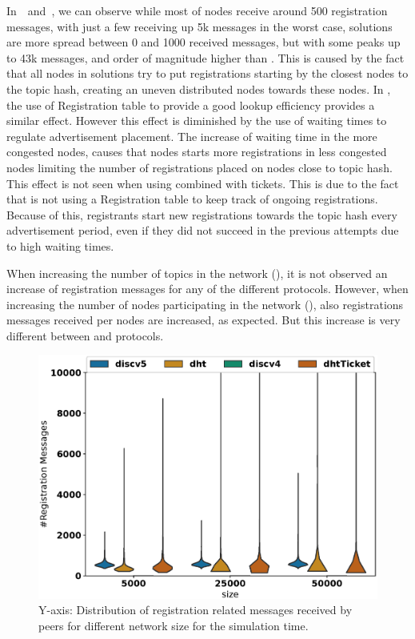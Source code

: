 In~~and~,  we can observe while most of \sysname nodes receive around 500 registration messages,  with just a few receiving up 5k messages in the worst case,  \altname solutions are more spread between 0 and 1000 received messages, but with some peaks up to 43k messages,  and order of magnitude higher than \sysname.
This is caused by the fact that all nodes in \altname solutions try to put registrations starting by the closest nodes to the topic hash,  creating an uneven distributed nodes towards these nodes. 
In \sysname, the use of Registration table to provide a good lookup efficiency provides a similar effect. 
However this effect is diminished by the use of waiting times to regulate advertisement placement.  The increase of waiting time in the more congested nodes, causes that nodes starts more registrations in less congested nodes limiting the number of registrations placed on nodes close to topic hash.
This effect is not seen when using \altname combined with tickets. 
This is due to the fact that \altname is not using a Registration table to keep track of ongoing registrations.  Because of this,  registrants start new registrations towards the topic hash every advertisement period, even if they did not succeed in the previous attempts due to high waiting times.

When increasing the number of topics in the network (), it is not observed an increase of registration messages for any of the different protocols. 
However,  when increasing the number of nodes participating in the network (),  also registrations messages received per nodes are increased, as expected.
But this increase is very different between \sysname and \altname protocols.


\begin{figure}[!h]
\centering
\includegraphics[width=\linewidth]{results/efficiency/violin_size_registrationMsgs.eps}
\caption{Y-axis: Distribution of registration related messages received by peers for different network size for the simulation time.}
\label{fig:regMsgsPerSize}
\end{figure}

